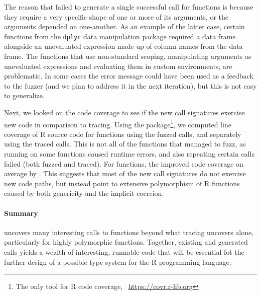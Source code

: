 \documentclass[sigplan,nonacm,anonymous,review]{acmart}
\begin{document}
The reason that \tool failed to generate a single successful call for \UFNumMissingFunctionSignatr functions is because they require a very specific shape of one or more of its arguments, or the arguments depended on one-another.
As an example of the latter case, certain functions from the {\tt dplyr} data manipulation package required a data frame alongside an unevaluated expression made up of column names from the data frame. 
The functions that use non-standard scoping, manipulating arguments as unevaluated expressions and evaluating them in custom environments, are problematic.
In some cases the error message could have been used as a feedback to the fuzzer (and we plan to address it in the next iteration), but this is not easy to generalize.

Next, we looked on the code coverage to see if the new call signatures exercise new code in comparison to tracing.
Using the  package\footnote{The only tool for R code coverage, \Cf~\url{https://covr.r-lib.org}}, we computed line coverage of R source code for \UFNumFunctionsWithBothCoverage functions using the fuzzed calls, and separately using the traced calls.
This is not all of the functions that \tool managed to fuzz, as running  on some functions caused runtime errors, and also repeating certain calls failed (both fuzzed and traced).
For \UFBetterCoverage functions, the \tool improved code coverage on average by \UFBetterCoverageMean.
This suggests that most of the new call signatures do not exercise new code paths, but instead point to extensive polymorphism of R functions caused by both genericity and the implicit coercion. 

\paragraph{Summary}

\tool uncovers many interesting calls to functions beyond what tracing uncovers alone, particularly for highly polymorphic functions.
Together, existing and generated calls yields a wealth of interesting, runnable code that will be essential fot the further design of a possible type system for the R programming language.
\end{document}
